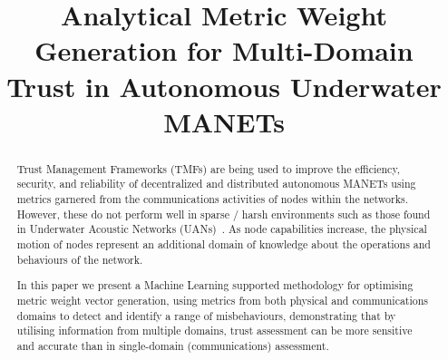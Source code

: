 \documentclass[conference]{IEEEtran}
\begin{document}
%
\title{Analytical Metric Weight Generation for Multi-Domain Trust in Autonomous Underwater MANETs}


\author{
}%

\maketitle

\begin{abstract}

Trust Management Frameworks (TMFs) are being used to improve the efficiency, security, and reliability of decentralized and distributed autonomous MANETs using metrics garnered from the communications activities of nodes within the networks.
However, these do not perform well in sparse / harsh environments such as those found in Underwater Acoustic Networks (UANs)~\cite{Bolster2015}.
As node capabilities increase, the physical motion of nodes represent an additional domain of knowledge about the operations and behaviours of the network.

In this paper we present a Machine Learning supported methodology for optimising metric weight vector generation, using metrics from both physical and communications domains to detect and identify a range of misbehaviours, demonstrating that by utilising information from multiple domains, trust assessment can be more sensitive and accurate than in single-domain (communications) assessment.
\end{abstract}

%
\IEEEpeerreviewmaketitle
\end{document}
